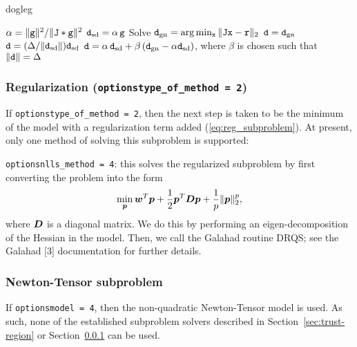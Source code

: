 \begin{algorithm}
\caption{dogleg}
\label{alg:dogleg}
  \begin{algorithmic}[1]
     
        \State $\alpha = \|{\tt g}\|^2 / \|{\tt J} * {\tt g}\|^2$
        \State ${\tt d}_{\rm sd} = \alpha \,{\tt g}$
        \State Solve ${\tt d}_{\rm gn} = \arg \min_{{\tt x}}\|{\tt J} {\tt x}- {\tt r}\|_2$
        \State ${\tt d} = {\tt d}_{\rm gn}$
        \State ${\tt d} = (\Delta / \|{\tt d}_{\rm sd}\|) {\tt d}_{\rm sd}$
        \Else
        \State ${\tt d} = \alpha \, {\tt d}_{\rm sd} + \beta\, ({\tt d}_{\rm gn} - \alpha {\tt d}_{\rm sd})$, where $\beta$ is chosen such that $\|{\tt d}\| = \Delta$
        \EndIf
  \end{algorithmic}
\end{algorithm}

\subsubsection{Regularization ({\tt options\ct type\_of\_method = 2})}
\label{sec:regularization}

If {\tt options\ct type\_of\_method = 2}, then the next step is taken to be the minimum
of the model with a regularization term added (\ref{eq:reg_subproblem}).  At present,
only one method of solving this subproblem is supported:

\begin{description}
\item {\tt options\ct nlls\_method = 4}: this solves the regularized subproblem by first
converting the problem into the form
$$\min_{\bm p} {\bm w}^T {\bm p} + \frac{1}{2} {\bm p}^T {\bm D} {\bm p} + \frac{1}{p}\|{\bm p}\|_2^p,$$
where ${\bm D}$ is a diagonal matrix.  We do this by performing an eigen-decomposition of
the Hessian in the model.  Then, we call the {\sc Galahad} routine {\sc DRQS}; see
the {\sc Galahad} [3] documentation for further details.
\end{description}

\subsubsection{Newton-Tensor subproblem}
\label{sec:newton_tensor_subproblem}

If {\tt options\ct model = 4}, then the non-quadratic Newton-Tensor model is used.  As such, none of the established subproblem solvers described in Section~\ref{sec:trust-region} or Section~\ref{sec:regularization} can be used.

